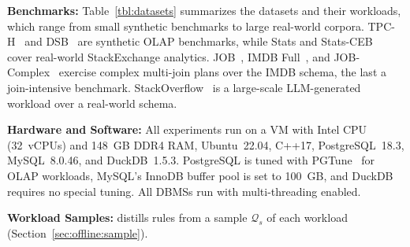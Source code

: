 \textbf{Benchmarks:} Table~\ref{tbl:datasets} summarizes the datasets and their workloads, which range from small synthetic benchmarks to large real-world corpora. \textsf{TPC-H}~\cite{tpch} and \textsf{DSB}~\cite{DSB} are synthetic OLAP benchmarks, while \textsf{Stats} and \textsf{Stats-CEB}~\cite{CEDBMS} cover real-world StackExchange analytics. \textsf{JOB}~\cite{LeisGMBK015}, \textsf{IMDB Full}~\cite{flowloss}, and \textsf{JOB-Complex}~\cite{JOBComplex} exercise complex multi-join plans over the \textsf{IMDB} schema, the last a join-intensive benchmark. \textsf{StackOverflow}~\cite{SQlStorm} is a large-scale LLM-generated workload over a real-world schema.

\textbf{Hardware and Software:} All experiments run on a VM with Intel CPU (32~vCPUs) and 148~GB DDR4 RAM, Ubuntu~22.04, C++17, PostgreSQL~18.3, MySQL~8.0.46, and DuckDB~1.5.3. PostgreSQL is tuned with PGTune~\cite{PGTune} for OLAP workloads, MySQL's InnoDB buffer pool is set to 100~GB, and DuckDB requires no special tuning. All DBMSs run with multi-threading enabled.


\textbf{Workload Samples:} {\sys} distills rules from a sample $\mathcal{Q}_s$ of each workload (Section~\ref{sec:offline:sample}).  

